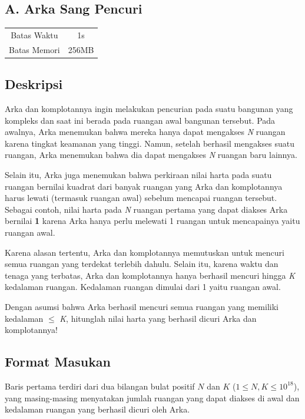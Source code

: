 \documentclass{article}
\begin{document}
\begin{center}
    \section*{A. Arka Sang Pencuri} %

    \begin{tabular}{ | c c | }
        \hline
        Batas Waktu  & 1s \\    %
        Batas Memori & 256MB \\  %
        \hline
    \end{tabular}
\end{center}

\subsection*{Deskripsi}
Arka dan komplotannya ingin melakukan pencurian pada suatu bangunan yang kompleks dan saat ini berada pada ruangan awal bangunan tersebut. Pada awalnya, Arka menemukan bahwa mereka hanya dapat mengakses \textit{N} ruangan karena tingkat keamanan yang tinggi. Namun, setelah berhasil mengakses suatu ruangan, Arka menemukan bahwa dia dapat mengakses \textit{N} ruangan baru lainnya.

Selain itu, Arka juga menemukan bahwa perkiraan nilai harta pada suatu ruangan bernilai kuadrat dari banyak ruangan yang Arka dan komplotannya harus lewati (termasuk ruangan awal) sebelum mencapai ruangan tersebut. Sebagai contoh, nilai harta pada \textit{N} ruangan pertama yang dapat diakses Arka bernilai \textbf{1} karena Arka hanya perlu melewati 1 ruangan untuk mencapainya yaitu ruangan awal. 

Karena alasan tertentu, Arka dan komplotannya memutuskan untuk mencuri semua ruangan yang terdekat terlebih dahulu. Selain itu, karena waktu dan tenaga yang terbatas, Arka dan komplotannya hanya berhasil mencuri hingga \textit{K} kedalaman ruangan. Kedalaman ruangan dimulai dari 1 yaitu ruangan awal. 

Dengan asumsi bahwa Arka berhasil mencuri semua ruangan yang memiliki kedalaman $\leq$ \textit{K}, hitunglah nilai harta yang berhasil dicuri Arka dan komplotannya! 

\subsection*{Format Masukan}
Baris pertama terdiri dari dua bilangan bulat positif $N$ dan $K$ ($1 \leq N, K \leq 10^{18}$), yang masing-masing menyatakan jumlah ruangan yang dapat diakses di awal dan kedalaman ruangan yang berhasil dicuri oleh Arka.
\end{document}
